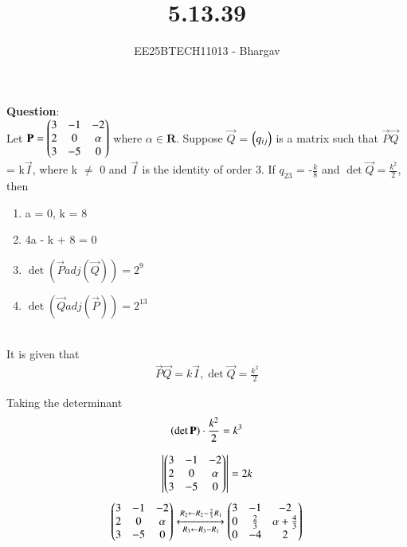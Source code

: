 \documentclass[journal]{IEEEtran}
\begin{document}

\vspace{3cm}

\title{5.13.39}
\author{EE25BTECH11013 - Bhargav}
\maketitle
{\let\newpage\relax\maketitle}

\renewcommand{\thefigure}{\theenumi}
\renewcommand{\thetable}{\theenumi}
\setlength{\intextsep}{10pt} %

\renewcommand{\thetable}{\theenumi}

\textbf{Question}:\\
Let $\mathbf{P} = \begin{pmatrix}3 & -1 & -2 \\ 2 & 0 & \alpha \\ 3 & -5 & 0\end{pmatrix}$ where $\alpha \in \mathbf{R}$. Suppose $\vec{Q}$ = $\begin{pmatrix}q_{ij}\end{pmatrix}$ is a matrix such that $\vec{P}\vec{Q}$ = k$\vec{I}$, where k $\neq$ 0 and $\vec{I}$ is the identity of order 3. If $q_{23}$ = -$\frac{k}{8}$ and $\det{\vec{Q}} = \frac{k^2}{2}$, then 
\begin{enumerate}
\item a = 0, k = 8
\item 4a - k + 8 = 0
\item $\det{(\vec{P} adj(\vec{Q}))} = 2^9$
\item $\det{(\vec{Q} adj(\vec{P}))} = 2^{13}$
\end{enumerate}



\solution \\
It is given that
\begin{align}
\vec{P}\vec{Q} = k\vec{I}, \det{\vec{Q}} = \frac{k^2}{2}
\end{align}

Taking the determinant
\begin{align}
\left(\det{\mathbf{P}}\right) \cdot \frac{k^2}{2} = k^3
\end{align}

\begin{align}
\left\vert\begin{pmatrix}3 & -1 & -2 \\ 2 & 0 & \alpha \\ 3 & -5 & 0\end{pmatrix}\right\vert = 2k
\end{align}
\begin{align}
\begin{pmatrix}3 & -1 & -2 \\ 2 & 0 & \alpha \\ 3 & -5 & 0\end{pmatrix} \xleftrightarrow[R_3 \leftarrow R_3 - R_1]{R_2 \leftarrow R_2 - \frac{2}{3}R_1}\begin{pmatrix}3 & -1 & -2 \\ 0 & \frac{2}{3} & \alpha + \frac{4}{3} \\ 0 & -4 & 2\end{pmatrix}
\end{align}
\end{document}
